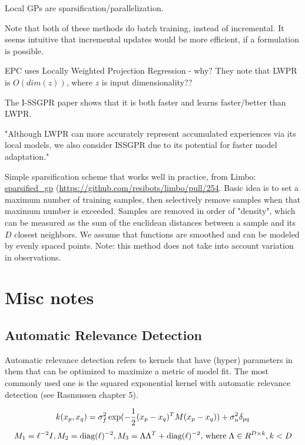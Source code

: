 \documentclass[a4paper]{article}
\begin{document}
Local GPs are sparsification/parallelization.

Note that both of these methods do batch training, instead of incremental. It seems intuitive that incremental updates would be more efficient, if a formulation is possible. 

EPC uses Locally Weighted Projection Regression - why? They note that LWPR is $O(dim(z))$, where $z$ is input dimensionality?? 

The I-SSGPR paper shows that it is both faster and learns faster/better than LWPR. 

"Although LWPR can more accurately represent accumulated experiences via its local models, we also consider ISSGPR due to its potential for faster model adaptation."

Simple sparsification scheme that works well in practice, from Limbo: \href{https://github.com/resibots/limbo/blob/master/src/limbo/model/sparsified_gp.hpp}{sparsified_gp} (\href{notes are from here}{https://github.com/resibots/limbo/pull/254}. Basic idea is to set a maximum number of training samples, then selectively remove samples when that maximum number is exceeded. Samples are removed in order of "density", which can be measured as the sum of the euclidean distances between a sample and its $D$ closest neighbors. We assume that functions are smoothed and can be modeled by evenly spaced points. Note: this method does not take into account variation in observations. 

\section{Misc notes}

\subsection{Automatic Relevance Detection}

Automatic relevance detection refers to kernels that have (hyper) parameters in them that can be optimized to maximize a metric of model fit. The most commonly used one is the squared exponential kernel with automatic relevance detection (see Rasmussen chapter 5). 

$$k(x_p, x_q) = \sigma_f^2 \exp(-\frac{1}{2} (x_p - x_q)^T M (x_p - x_q) ) + \sigma_n^2 \delta_{pq} \\$$
$$M_1 = \ell^{-2} I, M_2 = \text{diag}(\mathbf{\ell})^{-2}, M_3 = \Lambda \Lambda^T + \text{diag}(\ell)^{-2}, \hspace{0.5mm} \text{where} \hspace{1mm} \Lambda \in R^{D\times k}, k<D$$
\end{document}

